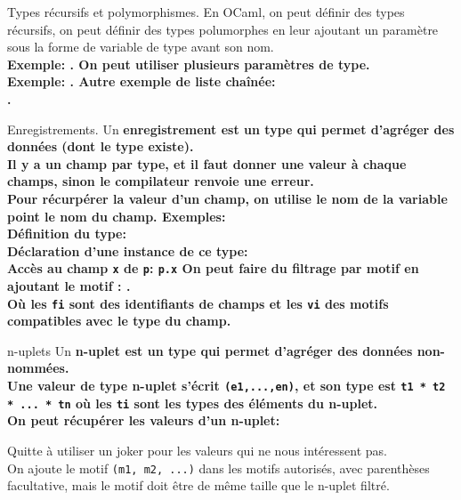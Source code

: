 \documentclass[french, 11pt]{article}
\begin{document}
\begin{defi}{Types récursifs et polymorphismes.}{}
    En OCaml, on peut définir des types récursifs, on peut définir des types polumorphes en leur ajoutant un paramètre sous la forme de variable de type avant son nom.\\
    \bf{Exemple:} .\n
    On peut utiliser plusieurs paramètres de type.\\
    \bf{Exemple:} .\n
    Autre exemple de liste chaînée:\\
    .
\end{defi}

\begin{defi}{Enregistrements.}{}
    Un \bf{enregistrement} est un type qui permet d'agréger des données (dont le type existe).\\
    Il y a un champ par type, et il faut donner une valeur à chaque champs, sinon le compilateur renvoie une erreur.\\
    Pour récurpérer la valeur d'un champ, on utilise le nom de la variable point le nom du champ.\n
    \bf{Exemples:}\\
    Définition du type: \\
    Déclaration d'une instance de ce type: \\
    Accès au champ \texttt{x} de \texttt{p}: \texttt{p.x}\n
    On peut faire du filtrage par motif en ajoutant le motif : .\\
    Où les \texttt{fi} sont des identifiants de champs et les \texttt{vi} des motifs compatibles avec le type du champ.
\end{defi}


\begin{defi}{n-uplets}{}
    Un \bf{n-uplet} est un type qui permet d'agréger des données non-nommées.\\
    Une valeur de type n-uplet s'écrit \texttt{(e1,...,en)}, et son type est \texttt{t1 * t2 * ... * tn} où les \texttt{ti} sont les types des éléments du n-uplet.\\
    On peut récupérer les valeurs d'un n-uplet:
    \begin{center}
    \end{center}
    Quitte à utiliser un joker pour les valeurs qui ne nous intéressent pas.\\
    On ajoute le motif \texttt{(m1, m2, ...)} dans les motifs autorisés, avec parenthèses facultative, mais le motif doit être de même taille que le n-uplet filtré.
\end{defi}
\end{document}
